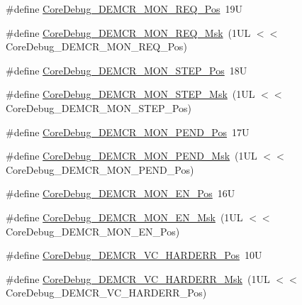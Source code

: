 \begin{DoxyCompactItemize}
\item 
\#define \mbox{\hyperlink{group___c_m_s_i_s___core_debug_ga341020a3b7450416d72544eaf8e57a64}{Core\+Debug\+\_\+\+D\+E\+M\+C\+R\+\_\+\+M\+O\+N\+\_\+\+R\+E\+Q\+\_\+\+Pos}}~19U
\item 
\#define \mbox{\hyperlink{group___c_m_s_i_s___core_debug_gae6384cbe8045051186d13ef9cdeace95}{Core\+Debug\+\_\+\+D\+E\+M\+C\+R\+\_\+\+M\+O\+N\+\_\+\+R\+E\+Q\+\_\+\+Msk}}~(1\+U\+L $<$$<$ Core\+Debug\+\_\+\+D\+E\+M\+C\+R\+\_\+\+M\+O\+N\+\_\+\+R\+E\+Q\+\_\+\+Pos)
\item 
\#define \mbox{\hyperlink{group___c_m_s_i_s___core_debug_ga9ae10710684e14a1a534e785ef390e1b}{Core\+Debug\+\_\+\+D\+E\+M\+C\+R\+\_\+\+M\+O\+N\+\_\+\+S\+T\+E\+P\+\_\+\+Pos}}~18U
\item 
\#define \mbox{\hyperlink{group___c_m_s_i_s___core_debug_ga2ded814556de96fc369de7ae9a7ceb98}{Core\+Debug\+\_\+\+D\+E\+M\+C\+R\+\_\+\+M\+O\+N\+\_\+\+S\+T\+E\+P\+\_\+\+Msk}}~(1\+U\+L $<$$<$ Core\+Debug\+\_\+\+D\+E\+M\+C\+R\+\_\+\+M\+O\+N\+\_\+\+S\+T\+E\+P\+\_\+\+Pos)
\item 
\#define \mbox{\hyperlink{group___c_m_s_i_s___core_debug_ga1e2f706a59e0d8131279af1c7e152f8d}{Core\+Debug\+\_\+\+D\+E\+M\+C\+R\+\_\+\+M\+O\+N\+\_\+\+P\+E\+N\+D\+\_\+\+Pos}}~17U
\item 
\#define \mbox{\hyperlink{group___c_m_s_i_s___core_debug_ga68ec55930269fab78e733dcfa32392f8}{Core\+Debug\+\_\+\+D\+E\+M\+C\+R\+\_\+\+M\+O\+N\+\_\+\+P\+E\+N\+D\+\_\+\+Msk}}~(1\+U\+L $<$$<$ Core\+Debug\+\_\+\+D\+E\+M\+C\+R\+\_\+\+M\+O\+N\+\_\+\+P\+E\+N\+D\+\_\+\+Pos)
\item 
\#define \mbox{\hyperlink{group___c_m_s_i_s___core_debug_ga802829678f6871863ae9ecf60a10425c}{Core\+Debug\+\_\+\+D\+E\+M\+C\+R\+\_\+\+M\+O\+N\+\_\+\+E\+N\+\_\+\+Pos}}~16U
\item 
\#define \mbox{\hyperlink{group___c_m_s_i_s___core_debug_gac2b46b9b65bf8d23027f255fc9641977}{Core\+Debug\+\_\+\+D\+E\+M\+C\+R\+\_\+\+M\+O\+N\+\_\+\+E\+N\+\_\+\+Msk}}~(1\+U\+L $<$$<$ Core\+Debug\+\_\+\+D\+E\+M\+C\+R\+\_\+\+M\+O\+N\+\_\+\+E\+N\+\_\+\+Pos)
\item 
\#define \mbox{\hyperlink{group___c_m_s_i_s___core_debug_gaed9f42053031a9a30cd8054623304c0a}{Core\+Debug\+\_\+\+D\+E\+M\+C\+R\+\_\+\+V\+C\+\_\+\+H\+A\+R\+D\+E\+R\+R\+\_\+\+Pos}}~10U
\item 
\#define \mbox{\hyperlink{group___c_m_s_i_s___core_debug_ga803fc98c5bb85f10f0347b23794847d1}{Core\+Debug\+\_\+\+D\+E\+M\+C\+R\+\_\+\+V\+C\+\_\+\+H\+A\+R\+D\+E\+R\+R\+\_\+\+Msk}}~(1\+U\+L $<$$<$ Core\+Debug\+\_\+\+D\+E\+M\+C\+R\+\_\+\+V\+C\+\_\+\+H\+A\+R\+D\+E\+R\+R\+\_\+\+Pos)
$$
\end{DoxyCompactItemize}
